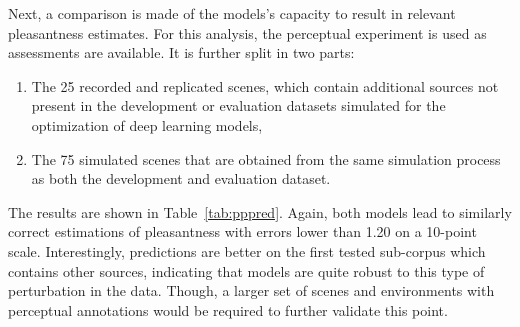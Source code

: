 \documentclass[11pt,a4paper]{article}
\begin{document}
\begin{table}[t]
\centering
\caption{Comparison of performances of models predicting source sound level or presence with metrics at the physical level. Levels and presence metrics are computed for n=8600 1s frames and time of presence metrics on n=200 45s scenes. (TP: true positive, TN: true negative, FP: false positive, FN: false negative)}
\label{tab:perf_cmp}
\end{table}

Next, a comparison is made of the models's capacity to result in relevant pleasantness estimates. For this analysis, the perceptual experiment is used as assessments are available. It is further split in two parts:
\begin{enumerate}
\item The 25 recorded and replicated scenes, which contain additional sources not present in the development or evaluation datasets simulated for the optimization of deep learning models,
\item The 75 simulated scenes that are obtained from the same simulation process as both the development and evaluation dataset.
\end{enumerate}
The results are shown in Table~\ref{tab:pppred}. Again, both models lead to similarly correct estimations of pleasantness with errors lower than 1.20 on a 10-point scale. Interestingly, predictions are better on the first tested sub-corpus which contains other sources, indicating that models are quite robust to this type of perturbation in the data. Though, a larger set of scenes and environments with perceptual annotations would be required to further validate this point.\\
\end{document}
